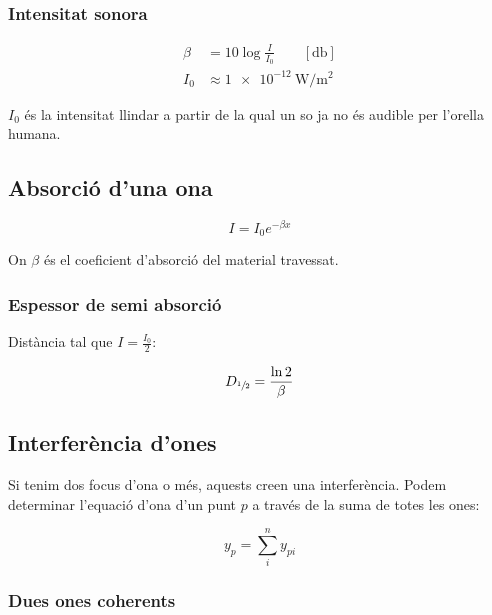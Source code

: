 \subsubsection{Intensitat sonora}
\label{ssub:intensitat_sonora}

\begin{align}
    \beta &= 10\log \frac{I}{I_0} \qquad [\si{\decibel}]\\
    I_0 &\approx \SI{1e-12}{\watt\per\metre\squared}
\end{align}

$I_0$ és la intensitat llindar a partir de la qual un so ja no és audible per
l'orella humana.

\pagebreak

\subsection{Absorció d'una ona}
\label{sub:absorcio_d_una_ona}

\begin{equation}
    I = I_0 e^{- \beta x}
\end{equation}

On $\beta$ és el coeficient d'absorció del material travessat.

\subsubsection{Espessor de semi absorció}
\label{ssub:espessor_de_semi_absorcio}

Distància tal que $I = \frac{I_0}{2}$:

\begin{equation}
    D_{\sfrac{1}{2}} = \frac{\ln 2}{\beta}
\end{equation}

\subsection{Interferència d'ones}
\label{sub:interferencia_d_ones}

Si tenim dos focus d'ona o més, aquests creen una interferència. Podem determinar
l'equació d'ona d'un punt $p$ a través de la suma de totes les ones:

\begin{equation}
    y_p = \sum_i^n y_{pi}
\end{equation}

\subsubsection{Dues ones coherents}
\label{ssub:dues_ones_coherents}

